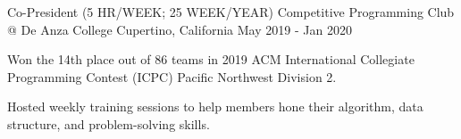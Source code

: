 \begin{cventries}
  \cventry
    {Co-President (5 HR/WEEK; 25 WEEK/YEAR)} %
    {Competitive Programming Club @ De Anza College} %
    {Cupertino, California} %
    {May 2019 - Jan 2020} %
    {
	\begin{cvitems} %
      	\item Won the 14th place out of 86 teams in 2019 ACM International Collegiate Programming Contest (ICPC) Pacific Northwest Division 2. 
      	\item Hosted weekly training sessions to help members hone their algorithm, data structure, and problem-solving skills. 
	\end{cvitems}
    }    
    

\end{cventries}
